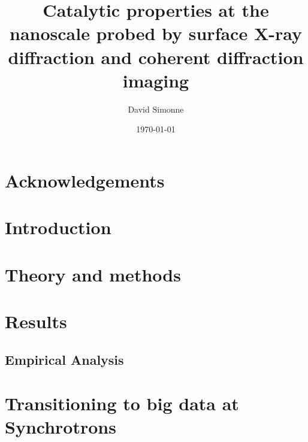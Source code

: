 \documentclass[12pt]{report}
\title{Catalytic properties at the nanoscale probed by surface X-ray diffraction and coherent diffraction imaging}
\author{David Simonne}
\date{\today}
\begin{document}
    

    \chapter*{Acknowledgements}
    

\frontmatter
{\hypersetup{linkcolor=black}
    \tableofcontents
    \listoffigures
    \listoftables
}

\mainmatter
    \chapter{Introduction} 
    
     
    \chapter{Theory and methods}
    
    
    
    
    
    
    
    \chapter{Results}
    
    
    \section{Empirical Analysis}
    
    
    \chapter{Transitioning to big data at Synchrotrons}
    
    
    
\end{document}
